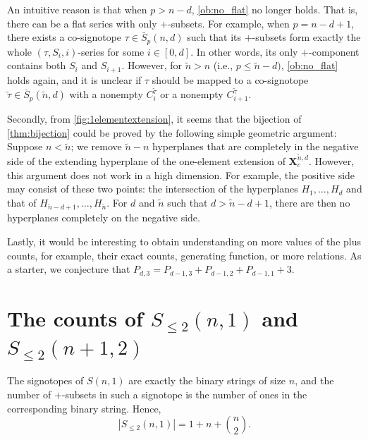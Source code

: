 \documentclass[a4paper,11pt]{amsart}
\newcommand{\tn}{\tilde{n}}
\begin{document}
An intuitive reason is that when $p > n-d$, \cref{ob:no_flat} no longer holds.
That is, there can be a flat series with only $+$-subsets.
For example, when $p = n-d+1$, there exists a co-signotope $\tau \in \bar{S}_{p}(n,d)$ such that its $+$-subsets form exactly the whole $(\tau,S_i,i)$-series for some $i \in [0,d]$.
In other words, its only $+$-component contains both $S_i$ and $S_{i+1}$.
However, for $\tn > n$ (i.e., $p \leq \tn-d)$, \cref{ob:no_flat} holds again, and it is unclear if $\tau$ should be mapped to a co-signotope $\tilde{\tau} \in \bar{S}_{p}(\tn,d)$ with a nonempty $C^{\tilde{\tau}}_i$ or
a nonempty $C^{\tilde{\tau}}_{i+1}$.

Secondly, from \cref{fig:1elementextension}, it seems that the bijection of \cref{thm:bijection} could be proved by the following simple geometric argument:
Suppose $n < \tn$; 
we remove $\tn-n$ hyperplanes that are completely in the negative side of the extending hyperplane of the one-element extension of $\mathbf{X}^{\tn,d}_c$.
However, this argument does not work in a high dimension.
For example, the positive side may consist of these two points: the intersection of the hyperplanes $H_1, \dots, H_d$ and that of $H_{\tn-d+1}, \dots, H_{\tn}$.
For $d$ and $\tn$ such that $d > \tn - d + 1$, there are then no hyperplanes completely on the negative side.

Lastly, it would be interesting to obtain understanding on more values of the plus counts, for example, their exact counts, generating function, or more relations.
As a starter, we conjecture that $P_{d,3} = P_{d-1,3} + P_{d-1,2} + P_{d-1,1} + 3$.

{
	
}

\appendix

\section{The counts of $S_{\leq 2}(n,1)$ and $S_{\leq 2}(n+1,2)$}
\label{app:tightness}

The signotopes of $S(n,1)$ are exactly the binary strings of size $n$, and the number of $+$-subsets in such a signotope is the number of ones in the corresponding binary string.
Hence, 
\[
    |S_{\leq 2}(n,1)| = 1 + n + {n \choose 2}.
\]
\end{document}
